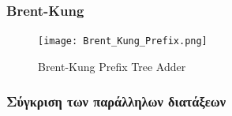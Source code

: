 \subsubsection*{Brent-Kung}
\begin{figure}[H]
    \centering
    \texttt{[image: Brent\_Kung\_Prefix.png]}
    \caption{Brent-Kung Prefix Tree Adder}
    \label{BrentKungTree}
\end{figure}







\subsubsection*{Σύγκριση των παράλληλων διατάξεων}

